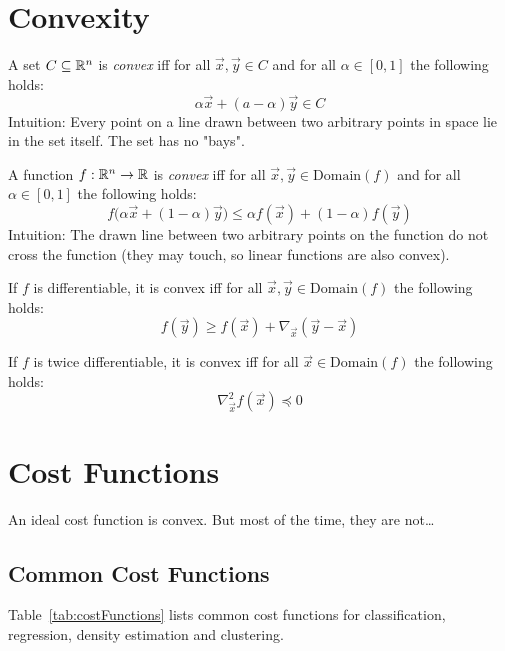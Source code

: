 	\section{Convexity}
		A set \( C \subseteq \mathbb{R}^n \) is \emph{convex} iff for all \( \vec{x}, \vec{y} \in C \) and for all \( \alpha \in [0, 1] \) the following holds:
		\begin{equation}
			\alpha\vec{x} + (a - \alpha)\vec{y} \in C
		\end{equation}
		Intuition: Every point on a line drawn between two arbitrary points in space lie in the set itself. The set has no "bays".

		A function \( f : \mathbb{R}^n \to \mathbb{R} \) is \emph{convex} iff for all \( \vec{x}, \vec{y} \in \textrm{Domain}(f) \) and for all \( \alpha \in [0, 1] \) the following holds:
		\begin{equation}
			f\big( \alpha\vec{x} + (1 - \alpha)\vec{y} \big) \leq \alpha f(\vec{x}) + (1 - \alpha)f(\vec{y})
		\end{equation}
		Intuition: The drawn line between two arbitrary points on the function do not cross the function (they may touch, so linear functions are also convex).

		If \(f\) is differentiable, it is convex iff for all \( \vec{x}, \vec{y} \in \textrm{Domain}(f) \) the following holds:
		\begin{equation}
			f(\vec{y}) \geq f(\vec{x}) + \nabla_{\vec{x}}(\vec{y} - \vec{x})
		\end{equation}

		If \(f\) is twice differentiable, it is convex iff for all \( \vec{x} \in \textrm{Domain}(f) \) the following holds:
		\begin{equation}
			\nabla_{\vec{x}}^2 f(\vec{x}) \preceq 0
		\end{equation}


	\section{Cost Functions}
		An ideal cost function is convex. But most of the time, they are not\dots

		\subsection{Common Cost Functions}
			Table~\ref{tab:costFunctions} lists common cost functions for classification, regression, density estimation and clustering.

